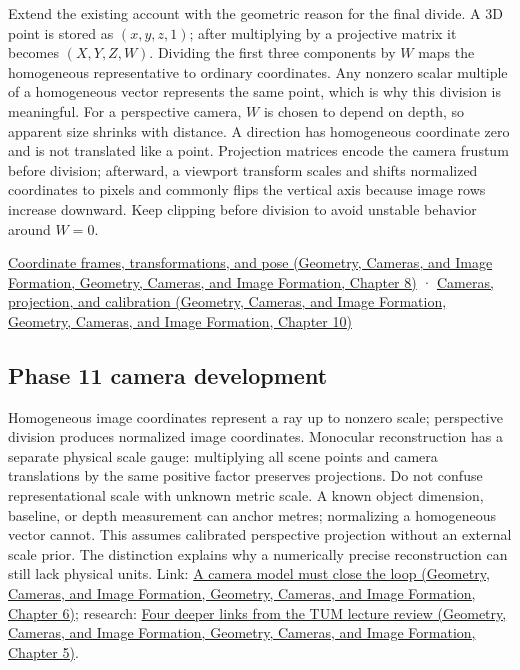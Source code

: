 Extend the existing account with the geometric reason for the final divide. A 3D point is stored as \((x,y,z,1)\); after multiplying by a projective matrix it becomes \((X,Y,Z,W)\). Dividing the first three components by \(W\) maps the homogeneous representative to ordinary coordinates. Any nonzero scalar multiple of a homogeneous vector represents the same point, which is why this division is meaningful. For a perspective camera, \(W\) is chosen to depend on depth, so apparent size shrinks with distance. A direction has homogeneous coordinate zero and is not translated like a point. Projection matrices encode the camera frustum before division; afterward, a viewport transform scales and shifts normalized coordinates to pixels and commonly flips the vertical axis because image rows increase downward. Keep clipping before division to avoid unstable behavior around \(W=0\).

\href{../03-Geometry-Cameras-and-Image-Formation/main.pdf\#nameddest=03-visual-computing-i-ch001-coordinate-frames-transformations-and-pose}{Coordinate frames, transformations, and pose (Geometry, Cameras, and Image Formation, Geometry, Cameras, and Image Formation, Chapter 8)} · \href{../03-Geometry-Cameras-and-Image-Formation/main.pdf\#nameddest=03-visual-computing-i-ch003-cameras-projection-and-calibration}{Cameras, projection, and calibration (Geometry, Cameras, and Image Formation, Geometry, Cameras, and Image Formation, Chapter 10)}

\subsection{Phase 11 camera development}\label{appendix-cb3b26862282-phase-11-camera-development}

Homogeneous image coordinates represent a ray up to nonzero scale; perspective division produces normalized image coordinates. Monocular reconstruction has a separate physical scale gauge: multiplying all scene points and camera translations by the same positive factor preserves projections. Do not confuse representational scale with unknown metric scale. A known object dimension, baseline, or depth measurement can anchor metres; normalizing a homogeneous vector cannot. This assumes calibrated perspective projection without an external scale prior. The distinction explains why a numerically precise reconstruction can still lack physical units. Link: \href{../03-Geometry-Cameras-and-Image-Formation/main.pdf\#nameddest=02-foundations-ii-ch037-a-camera-model-must-close-the-loop}{A camera model must close the loop (Geometry, Cameras, and Image Formation, Geometry, Cameras, and Image Formation, Chapter 6)}; research: \href{../03-Geometry-Cameras-and-Image-Formation/main.pdf\#nameddest=02-foundations-ii-ch036-four-deeper-links-from-the-tum-lecture-review}{Four deeper links from the TUM lecture review (Geometry, Cameras, and Image Formation, Geometry, Cameras, and Image Formation, Chapter 5)}.
